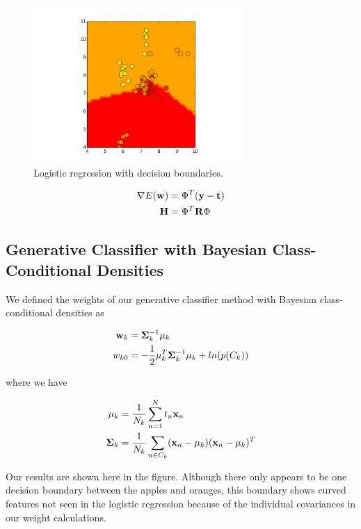 \documentclass[11pt]{amsart}
\begin{document}
\begin{figure}
  \includegraphics[width=8cm]{figure_2.png}
  \caption{Logistic regression with decision boundaries.}
\end{figure}

\begin{align*}
\nabla E(\bold{w}) &= \Phi ^ T (\bold{y} - \bold{t}) \\
\bold{H} &= \Phi ^T \bold{R} \Phi \\
\end{align*}

\subsection{Generative Classifier with Bayesian Class-Conditional Densities}

We defined the weights of our generative classifier method with Bayesian class-conditional densities as

\begin{align*}
\bold{w}_k &= \bold{\Sigma}_k ^{-1} \bold{\mu}_k \\
w_{k0} &= -\frac{1}{2}  \bold{\mu}_k ^ T \bold{\Sigma}_k ^{-1} \bold{\mu}_k + ln(p(C_k)) \\
\end{align*}

where we have

\begin{align*}
\bold{\mu}_k &= \frac{1}{N_k} \sum_{n = 1}^{N} t_n \bold{x}_n \\
\bold{\Sigma}_k &= \frac{1}{N_k} \sum_{n \in C_k} (\bold{x}_n - \mu_k)(\bold{x}_n - \mu_k) ^T \\
\end{align*}

Our results are shown here in the figure. Although there only appears to be one decision boundary between the apples and oranges, this boundary shows curved features not seen in the logistic regression because of the individual covariances in our weight calculations. 
\end{document}
